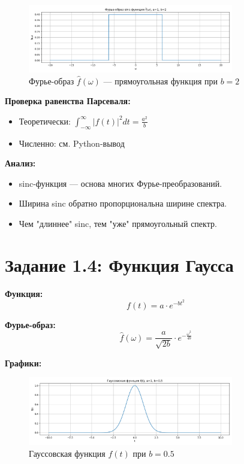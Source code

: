 \begin{figure}[H]
    \centering
    \includegraphics[width=0.8\textwidth]{sinc_spectrum_b2.png}
    \caption{Фурье-образ $\hat{f}(\omega)$ — прямоугольная функция при $b = 2$}
\end{figure}

\textbf{Проверка равенства Парсеваля:}

\begin{itemize}
    \item Теоретически: $\displaystyle \int_{-\infty}^{\infty} |f(t)|^2 dt = \frac{a^2}{b}$
    \item Численно: см. Python-вывод
\end{itemize}

\textbf{Анализ:}

\begin{itemize}
    \item sinc-функция — основа многих Фурье-преобразований.
    \item Ширина sinc обратно пропорциональна ширине спектра.
    \item Чем "длиннее" sinc, тем "уже" прямоугольный спектр.
\end{itemize}

\section*{Задание 1.4: Функция Гаусса}

\textbf{Функция:}
\[
f(t) = a \cdot e^{-b t^2}
\]

\textbf{Фурье-образ:}
\[
\hat{f}(\omega) = \frac{a}{\sqrt{2b}} \cdot e^{-\frac{\omega^2}{4b}}
\]

\textbf{Графики:}

\begin{figure}[H]
    \centering
    \includegraphics[width=0.8\textwidth]{gauss_function_b0.5.png}
    \caption{Гауссовская функция $f(t)$ при $b = 0.5$}
\end{figure}

